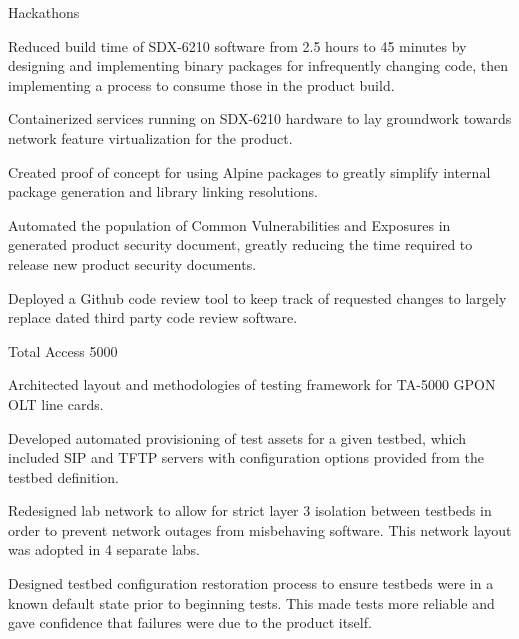 
\begin{cventries}
  \cventry
    {
} {Hackathons} {} {} {
      \begin{cvitems}
          \item {Reduced build time of SDX-6210 software from 2.5 hours to 45 minutes by designing and implementing binary packages for infrequently changing code, then implementing a process to consume those in the product build.}
          \item {Containerized services running on SDX-6210 hardware to lay groundwork towards network feature virtualization for the product.}
          \item {Created proof of concept for using Alpine packages to greatly simplify internal package generation and library linking resolutions.}
          \item {Automated the population of Common Vulnerabilities and Exposures in generated product security document, greatly reducing the time required to release new product security documents.}
          \item {Deployed a Github code review tool to keep track of requested changes to largely replace dated third party code review software.}
      \end{cvitems}
    }

  \cventry
    {
} {Total Access 5000} {} {} {
      \begin{cvitems}
        \item {Architected layout and methodologies of testing framework for TA-5000 GPON OLT line cards.}
        \item {Developed automated provisioning of test assets for a given testbed, which included SIP and TFTP servers with configuration options provided from the testbed definition.}
        \item {Redesigned lab network to allow for strict layer 3 isolation between testbeds in order to prevent network outages from misbehaving software. This network layout was adopted in 4 separate labs.}
        \item {Designed testbed configuration restoration process to ensure testbeds were in a known default state prior to beginning tests. This made tests more reliable and gave confidence that failures were due to the product itself.}
      \end{cvitems}
    }


\end{cventries}
